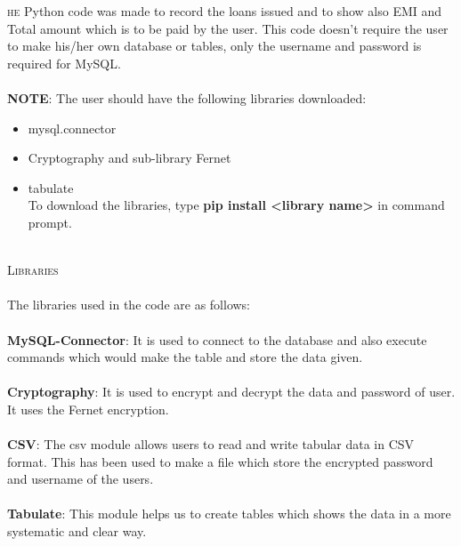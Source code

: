 \documentclass[12pt,a4paper]{article}
\begin{document}
	\newpage
	
	
	\begin{normalsize}
		{}
		\vspace{1.5cm}
		
		\lettrine{}{he} Python code was made to record the loans issued and to show also EMI and Total amount which is to be paid by the user. This code doesn't require the user to make his/her own database or tables, only the username and password is required for MySQL.\\
		\\
		\textbf{NOTE}: The user should have the following libraries downloaded:
		\begin{itemize}
			\item mysql.connector
			\item Cryptography and sub-library Fernet
			\item tabulate\\
			To download the libraries, type \textbf{pip install <library name>} in command prompt.
		\end{itemize}
		\lettrine{}{}
		{\\{\noindent \scshape \LARGE Libraries}}\\
		\\
		The libraries used in the code are as follows:\\
		\\
		\textbf{MySQL-Connector}: It is used to connect to the database and also execute commands which would make the table and store the data given.\\
		\\
		\textbf{Cryptography}: It is used to encrypt and decrypt the data and password of user. It uses the Fernet encryption.\\
		\\	
		\textbf{CSV}: The csv module allows users to read and write tabular data in CSV format. This has been used to make a file which store the encrypted password and username of the users.\\
		\\	
		\textbf{Tabulate}: This module helps us to create tables which shows the data in a more systematic and clear way.\\
		
		
		\label{key}	
		\lettrine{}{}
	\end{normalsize}
	
\end{document}
